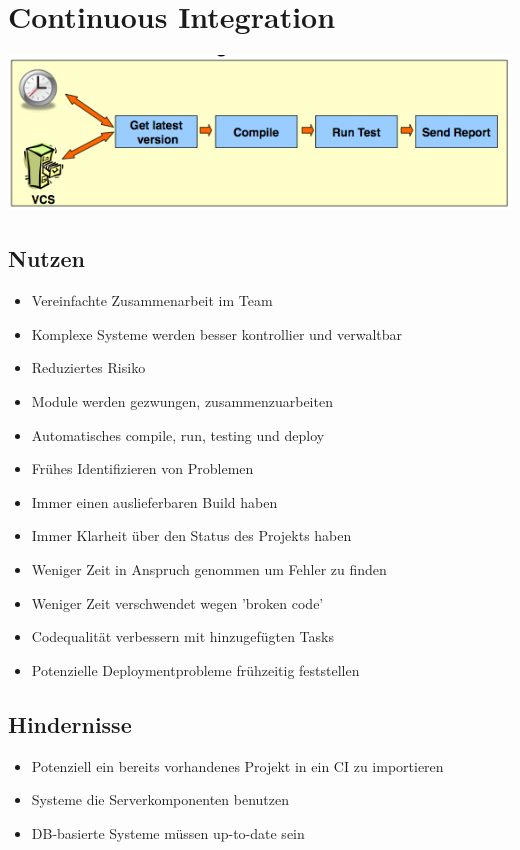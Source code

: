 \documentclass[a4paper,10pt]{article}
\begin{document}
\newpage
\section{Continuous Integration}
\includegraphics[scale=0.8]{continuous_integration.png}
\subsection{Nutzen}
\begin{itemize}
 \item Vereinfachte Zusammenarbeit im Team
 \item Komplexe Systeme werden besser kontrollier und verwaltbar
 \item Reduziertes Risiko
 \item Module werden gezwungen, zusammenzuarbeiten
 \item Automatisches compile, run, testing und deploy
 \item Frühes Identifizieren von Problemen
 \item Immer einen auslieferbaren Build haben
 \item Immer Klarheit über den Status des Projekts haben
 \item Weniger Zeit in Anspruch genommen um Fehler zu finden
 \item Weniger Zeit verschwendet wegen 'broken code'
 \item Codequalität verbessern mit hinzugefügten Tasks
 \item Potenzielle Deploymentprobleme frühzeitig feststellen
\end{itemize}

\subsection{Hindernisse}
\begin{itemize}
 \item Potenziell ein bereits vorhandenes Projekt in ein CI zu importieren
 \item Systeme die Serverkomponenten benutzen
 \item DB-basierte Systeme müssen up-to-date sein
\end{itemize}
\end{document}
